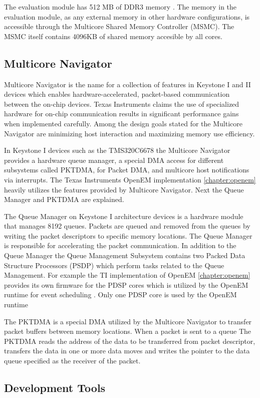 The evaluation module has 512 MB of DDR3 memory \cite{evmref}. The memory in
the evaluation module, as any external memory in other hardware configurations,
is accessible through the Multicore Shared Memory Controller (MSMC). The MSMC
itself contains 4096KB of shared memory accesible by all cores.

\subsection{Multicore Navigator}
\label{subsec:multicorenav}
Multicore Navigator is the name for a collection of features in Keystone I and
II devices which enables hardware-accelerated, packet-based communication
between the on-chip devices. Texas Instruments claims the use of specialized
hardware for on-chip communication results in significant performance gains
when implemented carefully. Among the design goals stated for the Multicore
Navigator are minimizing host interaction and maximizing memory use efficiency.
\cite{navigator}

In Keystone I devices such as the TMS320C6678 the Multicore Navigator provides 
a hardware queue manager, a special DMA access for different subsystems called
PKTDMA, for Packet DMA, and multicore host notifications via interrupts. 
\cite{navigator} The Texas Instruments OpenEM implementation 
\ref{chapter:openem} heavily utilizes the features provided by Multicore
Navigator. Next the Queue Manager and PKTDMA are explained.

The Queue Manager on Keystone I architecture devices is a hardware module that 
manages 8192 queues. Packets are queued and removed from the queues by writing
the packet descriptors to specific memory locations. The Queue Manager is
responsible for accelerating the packet communication. In addition to the Queue
Manager the Queue Management Subsystem contains two Packed Data Structure
Processors (PSDP) which perform tasks related to the Queue Management.
\cite{navigator} For example the TI implementation of OpenEM 
\ref{chapter:openem} provides its own firmware for the PDSP cores which is
utilized by the OpenEM runtime for event scheduling \cite{openemwhite}. Only
one PDSP core is used by the OpenEM runtime

The PKTDMA is a special DMA utilized by the Multicore Navigator to transfer
packet buffers between memory locations. When a packet is sent to a queue
The PKTDMA reads the address of the data to be transferred from packet 
descriptor, transfers the data in one or more data moves and writes the pointer
to the data queue specified as the receiver of the packet. \cite{navigator}
\subsection{Development Tools}
\label{subsec:devtools}

